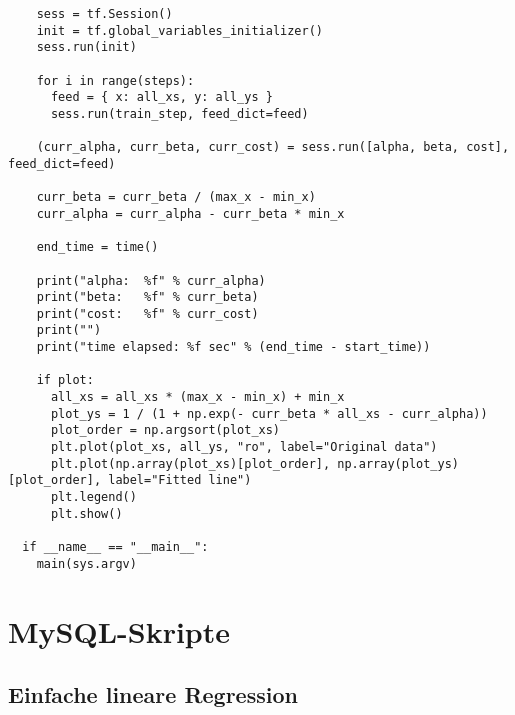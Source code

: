 \begin{verbatim}
    sess = tf.Session()
    init = tf.global_variables_initializer()
    sess.run(init)

    for i in range(steps):
      feed = { x: all_xs, y: all_ys }
      sess.run(train_step, feed_dict=feed)

    (curr_alpha, curr_beta, curr_cost) = sess.run([alpha, beta, cost], feed_dict=feed)

    curr_beta = curr_beta / (max_x - min_x)
    curr_alpha = curr_alpha - curr_beta * min_x

    end_time = time()

    print("alpha:  %f" % curr_alpha)
    print("beta:   %f" % curr_beta)
    print("cost:   %f" % curr_cost)
    print("")
    print("time elapsed: %f sec" % (end_time - start_time))

    if plot:
      all_xs = all_xs * (max_x - min_x) + min_x
      plot_ys = 1 / (1 + np.exp(- curr_beta * all_xs - curr_alpha))
      plot_order = np.argsort(plot_xs)
      plt.plot(plot_xs, all_ys, "ro", label="Original data")
      plt.plot(np.array(plot_xs)[plot_order], np.array(plot_ys)[plot_order], label="Fitted line")
      plt.legend()
      plt.show()

  if __name__ == "__main__":
    main(sys.argv)
\end{verbatim}

\chapter{MySQL-Skripte}

\section{Einfache lineare Regression}

